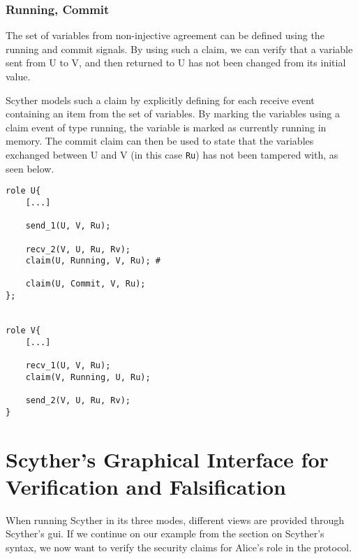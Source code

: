 \subsubsection{Running, Commit}

The set of variables from non-injective agreement can be defined using the running and commit signals. By using such a claim, we can verify that a variable sent from U to V, and then returned to U has not been changed from its initial value.

Scyther models such a claim by explicitly defining for each receive event containing an item from the set of variables. By marking the variables using a claim event of type running, the variable is marked as currently running in memory. The commit claim can then be used to state that the variables exchanged between U and V (in this case \texttt{Ru}) has not been tampered with, as seen below.\newline

\begin{lstlisting}
role U{
	[...]
	
	send_1(U, V, Ru);
	
	recv_2(V, U, Ru, Rv);
	claim(U, Running, V, Ru); # 
	
	claim(U, Commit, V, Ru);
};


role V{
	[...]
	
	recv_1(U, V, Ru);
	claim(V, Running, U, Ru);
	
	send_2(V, U, Ru, Rv); 
}
\end{lstlisting}

\section{Scyther's Graphical Interface for Verification and Falsification}

When running Scyther in its three modes, different views are provided through Scyther's \gls{gui}. If we continue on our example from the section on Scyther's syntax, we now want to verify the security claims for Alice's role in the protocol.